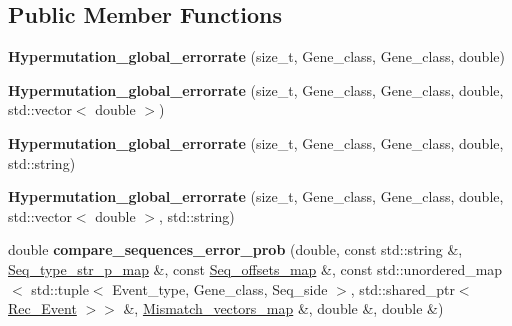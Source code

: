 \subsection*{Public Member Functions}
\begin{DoxyCompactItemize}
\item 
\mbox{\label{classHypermutation__global__errorrate_aa99aa2d1031715691a0400609870fd12}} 
{\bfseries Hypermutation\+\_\+global\+\_\+errorrate} (size\+\_\+t, Gene\+\_\+class, Gene\+\_\+class, double)
\item 
\mbox{\label{classHypermutation__global__errorrate_a8446c82e50941957b918d5ffeefe54a2}} 
{\bfseries Hypermutation\+\_\+global\+\_\+errorrate} (size\+\_\+t, Gene\+\_\+class, Gene\+\_\+class, double, std\+::vector$<$ double $>$)
\item 
\mbox{\label{classHypermutation__global__errorrate_ac10eac00b3cbf526c11a3ac492a25e7d}} 
{\bfseries Hypermutation\+\_\+global\+\_\+errorrate} (size\+\_\+t, Gene\+\_\+class, Gene\+\_\+class, double, std\+::string)
\item 
\mbox{\label{classHypermutation__global__errorrate_acb730ba80bd1c9e439b90350fc16a3a3}} 
{\bfseries Hypermutation\+\_\+global\+\_\+errorrate} (size\+\_\+t, Gene\+\_\+class, Gene\+\_\+class, double, std\+::vector$<$ double $>$, std\+::string)
\item 
\mbox{\label{classHypermutation__global__errorrate_a755458d801d03daef2f4b4f76a84df07}} 
double {\bfseries compare\+\_\+sequences\+\_\+error\+\_\+prob} (double, const std\+::string \&, \hyperlink{classEnum__fast__memory__map}{Seq\+\_\+type\+\_\+str\+\_\+p\+\_\+map} \&, const \hyperlink{classEnum__fast__memory__dual__key__map}{Seq\+\_\+offsets\+\_\+map} \&, const std\+::unordered\+\_\+map$<$ std\+::tuple$<$ Event\+\_\+type, Gene\+\_\+class, Seq\+\_\+side $>$, std\+::shared\+\_\+ptr$<$ \hyperlink{classRec__Event}{Rec\+\_\+\+Event} $>$$>$ \&, \hyperlink{classEnum__fast__memory__map}{Mismatch\+\_\+vectors\+\_\+map} \&, double \&, double \&)
\item 
\mbox{\label{classHypermutation__global__errorrate_a6374b1499163375fd8b5bf76661e1230}} 
$$
\end{DoxyCompactItemize}
